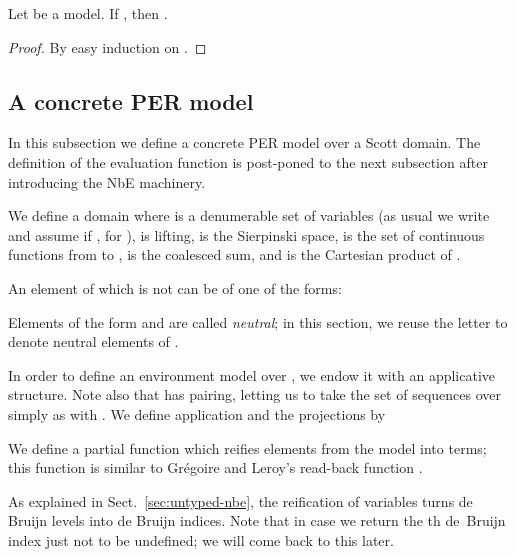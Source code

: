 \documentclass{LMCS}
\newcommand{\LONGVERSION}[1]{}
\newcommand{\SHORTVERSION}[1]{#1}
\newcommand{\LONGSHORT}[2]{\LONGVERSION{#1}\SHORTVERSION{#2}}
\begin{document}
{\begin{thm}
  \label{thm:soundness} Let  be a model. If ,
  then .
\end{thm}
\begin{proof} By easy induction on . 
\end{proof}

 
  \subsection{A concrete PER model} In this subsection we define a
  concrete PER model over a Scott domain. The definition of the
  evaluation function is post-poned to the next subsection after
  introducing the NbE machinery.}

\begin{defi}
  \label{def:domain}
  We define a domain 
   where  is a denumerable set
  of variables (as usual we write  and assume  if
  , for ), 
   is lifting,  
  is the Sierpinski
  space,  is the set of continuous functions from  to
  ,  is the coalesced sum\LONGSHORT{ (this is the
    disjoint union where all the bottoms elements are identified),}{,}
  and  is the Cartesian product of 
  \cite{dom-theory}. 



\end{defi}
An element of
 which is not  can be of one of the forms:
 
Elements of the form  and  are called
\emph{neutral}; in this section, we reuse the letter  to denote
neutral elements of .


In order to define an environment model over , we endow it with an
applicative structure. Note also that  has pairing, letting us to
take the set of sequences over  simply as  with
. We define application  and the projections  by
 
We define a partial function  which reifies elements from the model into terms; this
function is similar to Gr\'egoire and Leroy's read-back function
\cite{gregoireLeroy:compiledReduction}. 
\begin{defi}
  \label{def:reify}

\end{defi}

As explained in Sect.~\ref{sec:untyped-nbe}, the reification of
variables turns de Bruijn levels into de Bruijn indices. 
Note that in case  we
return the th de~Bruijn index just not to be undefined;
we will come back to this later. 
\end{document}
